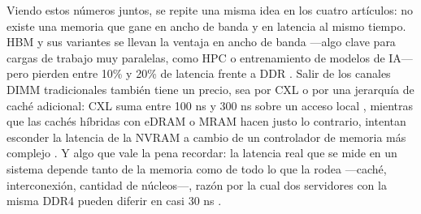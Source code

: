 Viendo estos números juntos, se repite una misma idea en los cuatro artículos: no existe una
memoria que gane en ancho de banda y en latencia al mismo tiempo. HBM y sus variantes se
llevan la ventaja en ancho de banda ---algo clave para cargas de trabajo muy paralelas, como HPC
o entrenamiento de modelos de IA--- pero pierden entre 10\% y 20\% de latencia frente a DDR
\cite{ibeid2025aurora,esmailidokht2024mess}. Salir de los canales DIMM tradicionales también
tiene un precio, sea por CXL o por una jerarquía de caché adicional: CXL suma entre 100 ns y 300
ns sobre un acceso local \cite{wang2024hitchhiker}, mientras que las cachés híbridas con eDRAM o
MRAM hacen justo lo contrario, intentan esconder la latencia de la NVRAM a cambio de un
controlador de memoria más complejo \cite{lurbe2023controlador}. Y algo que vale la pena recordar: la
latencia real que se mide en un sistema depende tanto de la memoria como de todo lo que la rodea
---caché, interconexión, cantidad de núcleos---, razón por la cual dos servidores con la misma
DDR4 pueden diferir en casi 30 ns \cite{esmailidokht2024mess}.